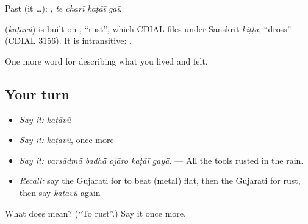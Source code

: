 Past (it …):    , \emph{te charī kaṭāī gaī}.

\begin{cousinweb}
\textbf{} (\emph{kaṭāvũ}) is built on \textbf{}, \textquotedblleft{}rust\textquotedblright{}, which CDIAL files under Sanskrit \emph{kiṭṭa}, \textquotedblleft{}dross\textquotedblright{} (CDIAL 3156). It is intransitive: \textbf{  }.
\end{cousinweb}

\begin{grammarlens}[title={What you've built}]
One more word for describing what you lived and felt.
\end{grammarlens}

\subsection*{Your turn}
\begin{itemize}
\raggedright
  \item \emph{Say it:} \emph{kaṭāvũ}
  \item \emph{Say it:} \emph{kaṭāvũ}, once more
  \item \emph{Say it:} \emph{varsādmā̃ badhā̃ ojāro kaṭāī gayā̃.} — All the tools rusted in the rain.
  \item \emph{Recall:} say the Gujarati for to beat (metal) flat, then the Gujarati for rust, then say \emph{kaṭāvũ} again
\end{itemize}

\begin{tcolorbox}[breakable,colback=teal!4,colframe=teal!35!black,title={Before you move on}]
What does  mean? (\textquotedblleft{}To rust\textquotedblright{}.) Say it once more.
\end{tcolorbox}
